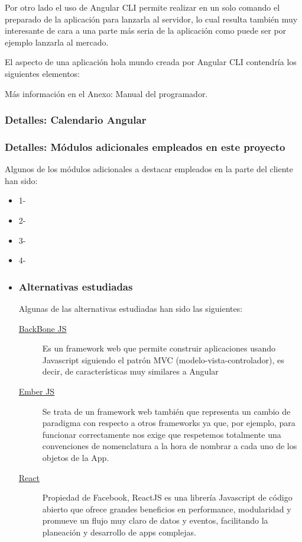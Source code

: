 Por otro lado el uso de Angular CLI permite realizar en un solo comando el preparado de la aplicación para lanzarla al servidor, lo cual resulta también muy interesante de cara a una parte más seria de la aplicación como puede ser por ejemplo lanzarla al mercado.

El aspecto de una aplicación hola mundo creada por Angular CLI contendría los siguientes elementos:


Más información en el Anexo: Manual del programador. 

\subsubsection{Detalles: Calendario Angular}\label{detalle_calendario}



\subsubsection{Detalles: Módulos adicionales empleados en este proyecto}\label{detalle_angularmodulos}
Algunos de los módulos adicionales a destacar empleados en la parte del cliente han sido:
\begin{itemize}
\tightlist
\item
1-
\item
2-
\item
3-
  \item
4-
\end{itemize}

\begin{itemize}
	\item	\subsubsection{Alternativas estudiadas}
	
	Algunas de las alternativas estudiadas han sido las siguientes:
	\begin{description}
\item[ \hyperlink{backbonejs.org/}{BackBone JS} ] Es un framework web que permite construir aplicaciones usando Javascript siguiendo el patrón MVC (modelo-vista-controlador), es decir, de características muy similares a Angular
\item[ \hyperlink{https://www.emberjs.com/}{Ember JS} ] Se trata de un framework web también que representa un cambio de paradigma con respecto a otros frameworks ya que, por ejemplo, para funcionar correctamente nos exige que respetemos totalmente una convenciones de nomenclatura a la hora de nombrar a cada uno de los objetos de la App.
\item[ \hyperlink{https://facebook.github.io/react/}{React} ] Propiedad de Facebook, ReactJS es una librería Javascript de código abierto que ofrece grandes beneficios en performance, modularidad y promueve un flujo muy claro de datos y eventos, facilitando la planeación y desarrollo de apps complejas. 
\end{description}

\end{itemize}




